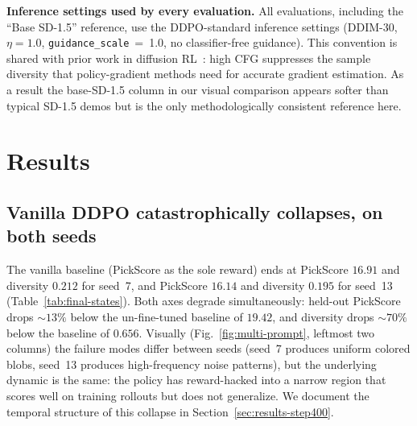 \documentclass[10pt,letterpaper]{article}
\newcommand{\paragraphhead}[1]{\vspace{0.4ex}\noindent\textbf{#1}\hspace{0.5em}}
\begin{document}
\paragraphhead{Inference settings used by every evaluation.}
All evaluations, including the ``Base SD-1.5'' reference, use the DDPO-standard inference settings (DDIM-30, $\eta=1.0$, \texttt{guidance\_scale}~=~1.0, no classifier-free guidance). This convention is shared with prior work in diffusion RL~\citep{Black23,Fan23}: high CFG suppresses the sample diversity that policy-gradient methods need for accurate gradient estimation. As a result the base-SD-1.5 column in our visual comparison appears softer than typical SD-1.5 demos but is the only methodologically consistent reference here.

\section{Results}
\label{sec:results}


\subsection{Vanilla DDPO catastrophically collapses, on both seeds}
\label{sec:results-vanilla}

The vanilla baseline (PickScore as the sole reward) ends at PickScore $16.91$ and diversity $0.212$ for seed~7, and PickScore $16.14$ and diversity $0.195$ for seed~13 (Table~\ref{tab:final-states}). Both axes degrade simultaneously: held-out PickScore drops ${\sim}13\%$ below the un-fine-tuned baseline of $19.42$, and diversity drops ${\sim}70\%$ below the baseline of $0.656$. Visually (Fig.~\ref{fig:multi-prompt}, leftmost two columns) the failure modes differ between seeds (seed~7 produces uniform colored blobs, seed~13 produces high-frequency noise patterns), but the underlying dynamic is the same: the policy has reward-hacked into a narrow region that scores well on training rollouts but does not generalize. We document the temporal structure of this collapse in Section~\ref{sec:results-step400}.
\end{document}
